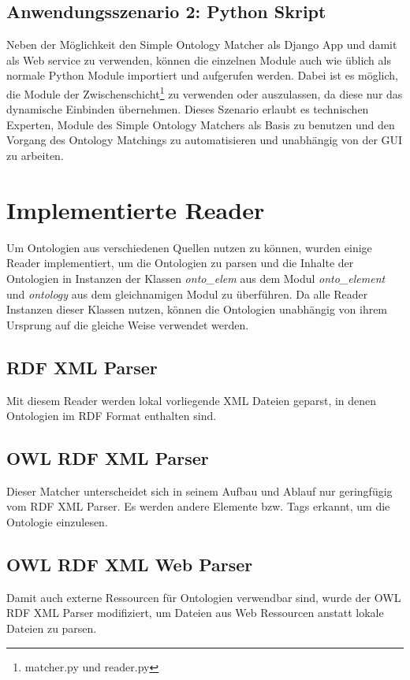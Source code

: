 		\subsection{Anwendungsszenario 2: Python Skript}
		Neben der Möglichkeit den Simple Ontology Matcher als Django App und damit als
		Web service zu verwenden, können die einzelnen Module auch wie üblich als
		normale Python Module importiert und aufgerufen werden. Dabei ist es möglich, die Module der
		Zwischenschicht\footnote{matcher.py und reader.py} zu verwenden oder
		auszulassen, da diese nur das dynamische Einbinden übernehmen. Dieses
		Szenario erlaubt es technischen Experten, Module des Simple Ontology Matchers
		als Basis zu benutzen und den Vorgang des Ontology Matchings zu
		automatisieren und unabhängig von der GUI zu arbeiten.
		
		\section{Implementierte Reader}
		Um Ontologien aus verschiedenen Quellen nutzen zu können, wurden einige Reader
		implementiert, um die Ontologien zu parsen und die Inhalte der Ontologien in
		Instanzen der Klassen \textit{onto\_elem} aus dem Modul \textit{onto\_element}
		und \textit{ontology} aus dem gleichnamigen Modul zu überführen. Da alle
		Reader Instanzen dieser Klassen nutzen, können die Ontologien unabhängig von
		ihrem Ursprung auf die gleiche Weise verwendet werden.
		
		\subsection{RDF XML Parser}
		Mit diesem Reader werden lokal vorliegende XML Dateien geparst, in denen
		Ontologien im RDF Format enthalten sind.
		
		\subsection{OWL RDF XML Parser}
		Dieser Matcher unterscheidet sich in seinem Aufbau und Ablauf nur geringfügig
		vom RDF XML Parser. Es werden andere Elemente bzw. Tags erkannt, um die
		Ontologie einzulesen.
		
		\subsection{OWL RDF XML Web Parser}
		Damit auch externe Ressourcen für Ontologien verwendbar sind, wurde der OWL
		RDF XML Parser modifiziert, um Dateien aus Web Ressourcen anstatt lokale
		Dateien zu parsen.
		
